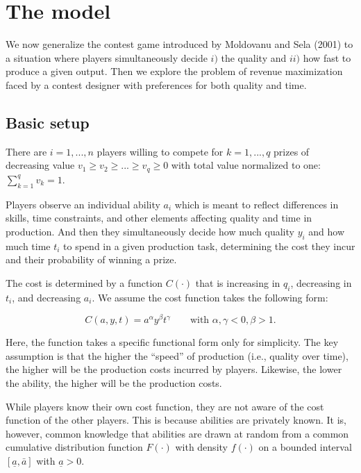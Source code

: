\documentclass[11pt, titlepage]{article}
\newcommand\lotype{\underline{a}}
\newcommand\hitype{\bar{a}}
\begin{document}
\section{The model}\label{the-model}

We now generalize the contest game introduced by Moldovanu and Sela
(2001) to a situation where players simultaneously decide \(i)\) the
quality and \(ii)\) how fast to produce a given output. Then we explore
the problem of revenue maximization faced by a contest designer with
preferences for both quality and time.

\subsection{Basic setup}\label{basic-setup}

There are \(i=1,..., n\) players willing to compete for \(k=1, ..., q\)
prizes of decreasing value \(v_1\geq v_2\geq ...\geq v_q\geq0\) with
total value normalized to one: \(\sum_{k=1}^q v_k =1\).

Players observe an individual ability \(a_i\) which is meant to reflect
differences in skills, time constraints, and other elements affecting
quality and time in production. And then they simultaneously decide how
much quality \(y_i\) and how much time \(t_i\) to spend in a given
production task, determining the cost they incur and their probability
of winning a prize.

The cost is determined by a function \(C(\cdot)\) that is increasing in
\(q_i\), decreasing in \(t_i\), and decreasing \(a_i\). We assume the
cost function takes the following form:

\begin{equation}
    C(a, y, t) = a^\alpha y^\beta t^\gamma \qquad\text{with }\alpha, \gamma < 0, \beta>1.
\end{equation}

Here, the function takes a specific functional form only for simplicity.
The key assumption is that the higher the ``speed'' of production (i.e.,
quality over time), the higher will be the production costs incurred by
players. Likewise, the lower the ability, the higher will be the
production costs.

While players know their own cost function, they are not aware of the
cost function of the other players. This is because abilities are
privately known. It is, however, common knowledge that abilities are
drawn at random from a common cumulative distribution function
\(F(\cdot)\) with density \(f(\cdot)\) on a bounded interval
\([\lotype, \hitype]\) with \(\lotype>0\).
\end{document}
